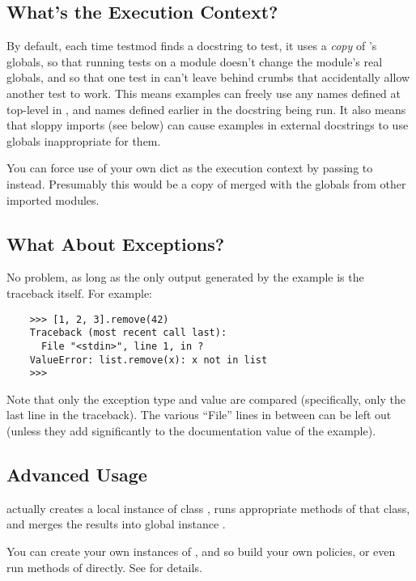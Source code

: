 \subsection{What's the Execution Context?}

By default, each time testmod finds a docstring to test, it uses a
{\em copy} of 's globals, so that running tests on a module
doesn't change the module's real globals, and so that one test in
 can't leave behind crumbs that accidentally allow another test
to work.  This means examples can freely use any names defined at top-level
in , and names defined earlier in the docstring being run.  It
also means that sloppy imports (see below) can cause examples in external
docstrings to use globals inappropriate for them.

You can force use of your own dict as the execution context by passing
 to  instead.  Presumably this
would be a copy of  merged with the globals from other
imported modules.

\subsection{What About Exceptions?}

No problem, as long as the only output generated by the example is the
traceback itself.  For example:

\begin{verbatim}
    >>> [1, 2, 3].remove(42)
    Traceback (most recent call last):
      File "<stdin>", line 1, in ?
    ValueError: list.remove(x): x not in list
    >>>
\end{verbatim}

Note that only the exception type and value are compared (specifically,
only the last line in the traceback).  The various ``File'' lines in
between can be left out (unless they add significantly to the documentation
value of the example).

\subsection{Advanced Usage}

 actually creates a local instance of class
, runs appropriate methods of that class, and merges
the results into global  instance .

You can create your own instances of , and so build your
own policies, or even run methods of  directly.  See
 for details.


